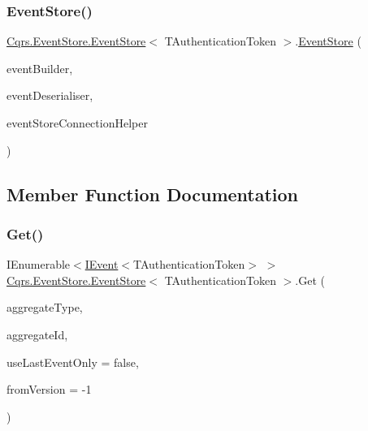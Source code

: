 \subsubsection{\texorpdfstring{Event\+Store()}{EventStore()}}
{\footnotesize\ttfamily \hyperlink{classCqrs_1_1EventStore_1_1EventStore}{Cqrs.\+Event\+Store.\+Event\+Store}$<$ T\+Authentication\+Token $>$.\hyperlink{classCqrs_1_1EventStore_1_1EventStore}{Event\+Store} (\begin{DoxyParamCaption}\item[{\hyperlink{interfaceCqrs_1_1EventStore_1_1IEventBuilder}{I\+Event\+Builder}$<$ T\+Authentication\+Token $>$}]{event\+Builder,  }\item[{\hyperlink{interfaceCqrs_1_1EventStore_1_1IEventDeserialiser}{I\+Event\+Deserialiser}$<$ T\+Authentication\+Token $>$}]{event\+Deserialiser,  }\item[{\hyperlink{interfaceCqrs_1_1EventStore_1_1IEventStoreConnectionHelper}{I\+Event\+Store\+Connection\+Helper}}]{event\+Store\+Connection\+Helper }\end{DoxyParamCaption})}



\subsection{Member Function Documentation}
\mbox{\label{classCqrs_1_1EventStore_1_1EventStore_a9d7b3a3ebcf110fe02d53e2ada19933d}} 
\subsubsection{\texorpdfstring{Get()}{Get()}\hspace{0.1cm}{\footnotesize\ttfamily [1/2]}}
{\footnotesize\ttfamily I\+Enumerable$<$\hyperlink{interfaceCqrs_1_1Events_1_1IEvent}{I\+Event}$<$T\+Authentication\+Token$>$ $>$ \hyperlink{classCqrs_1_1EventStore_1_1EventStore}{Cqrs.\+Event\+Store.\+Event\+Store}$<$ T\+Authentication\+Token $>$.Get (\begin{DoxyParamCaption}\item[{Type}]{aggregate\+Type,  }\item[{Guid}]{aggregate\+Id,  }\item[{bool}]{use\+Last\+Event\+Only = {\ttfamily false},  }\item[{int}]{from\+Version = {\ttfamily -\/1} }\end{DoxyParamCaption})}



